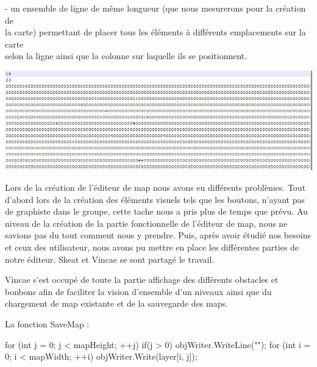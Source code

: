 \documentclass [11pt]{report}
\begin{document}
						\indent- un ensemble de ligne de même longueur (que nous mesurerons pour la création de \\\indent la carte) permettant de placer tous les éléments à différents emplacements sur la carte\\\indent selon la ligne ainsi que la colonne sur laquelle ils se positionnent.
						
						
						\vspace{10mm}
						
						\begin{center}
							\includegraphics[scale = 0.6]{images/lvl.png}
						\end{center}
						
						\vspace{10mm}
			
			
		
			 	
			 \indent Lors de la création de l'éditeur de map nous avons eu différents problèmes. Tout d'abord lors de la création des éléments visuels tels que les boutons, n'ayant pas de graphiste dans le groupe, cette tache nous a pris plus de temps que prévu. Au niveau de la création de la partie fonctionnelle de l'éditeur de map, nous ne savions pas du tout comment nous y prendre. Puis, après avoir étudié nos besoins et ceux des utilisateur, nous avons pu mettre en place les différentes parties de notre éditeur. Skeat et Vincae se sont partagé le travail.
			 
			 Vincae s'est occupé de toute la partie affichage des différents obstacles et bonbons afin de faciliter la vision d'ensemble d'un niveaux ainsi que du chargement de map existante et de la sauvegarde des maps.\\
			 
			 
			 
	\newpage
		
	\noindent La fonction SaveMap : 
			 
	 \begin{mylisting}
	
      for (int j = 0; j < mapHeight; ++j)
      {
        if(j > 0)
           objWriter.WriteLine("");
        for (int i = 0; i < mapWidth; ++i)
        {
           objWriter.Write(layer[i, j]);
        }
      }
      
	\end{mylisting}
		
\end{document}
